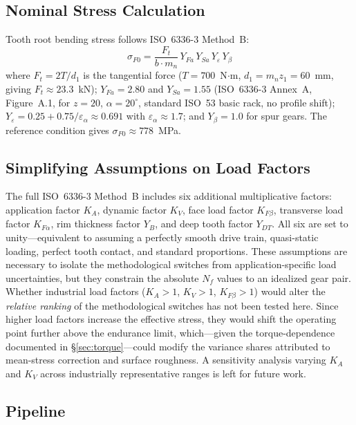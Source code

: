 \documentclass[12pt,a4paper]{article}
\begin{document}
\subsection{Nominal Stress Calculation}

Tooth root bending stress follows ISO~6336-3 Method~B:
\begin{equation}
\label{eq:sigma_F0}
\sigma_{F0} = \frac{F_t}{b \cdot m_n} \,
Y_{Fa} \, Y_{Sa} \, Y_\varepsilon \, Y_\beta
\end{equation}
where $F_t = 2T/d_1$ is the tangential force ($T=700$~N$\cdot$m,
$d_1 = m_n z_1 = 60$~mm, giving $F_t \approx 23.3$~kN);
$Y_{Fa}=2.80$ and $Y_{Sa}=1.55$ (ISO~6336-3 Annex~A, Figure~A.1,
for $z=20$, $\alpha=20^\circ$, standard ISO~53 basic rack, no profile
shift); $Y_\varepsilon = 0.25 + 0.75/\varepsilon_\alpha \approx 0.691$
with $\varepsilon_\alpha \approx 1.7$; and $Y_\beta = 1.0$ for spur
gears. The reference condition gives $\sigma_{F0} \approx 778$~MPa.

\subsection{Simplifying Assumptions on Load Factors}

The full ISO~6336-3 Method~B includes six additional multiplicative
factors: application factor $K_A$, dynamic factor $K_V$, face load
factor $K_{F\beta}$, transverse load factor $K_{F\alpha}$, rim
thickness factor $Y_B$, and deep tooth factor $Y_{DT}$. All six are set
to unity---equivalent to assuming a perfectly smooth drive train,
quasi-static loading, perfect tooth contact, and standard proportions.
These assumptions are necessary to isolate the methodological switches
from application-specific load uncertainties, but they constrain the
absolute $N_f$ values to an idealized gear pair. Whether industrial load
factors ($K_A > 1$, $K_V > 1$, $K_{F\beta} > 1$) would alter the
\emph{relative ranking} of the methodological switches has not been
tested here. Since higher load factors increase the effective stress,
they would shift the operating point further above the endurance limit,
which---given the torque-dependence documented in
\S\ref{sec:torque}---could modify the variance shares attributed to
mean-stress correction and surface roughness. A sensitivity analysis
varying $K_A$ and $K_V$ across industrially representative ranges is
left for future work.

\subsection{Pipeline}
\end{document}
